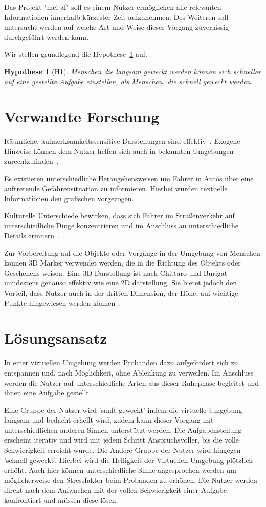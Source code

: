 \documentclass[a4paper, 11pt]{article}
\newtheorem{hyp}{Hypothese}
\newcommand{\projectName}{mci-af}
\begin{document}
Das Projekt "\projectName" soll es einem Nutzer ermöglichen alle relevanten Informationen innerhalb kürzester Zeit aufzunehmen. Des Weiteren soll untersucht werden auf welche Art und Weise dieser Vorgang zuverlässig durchgeführt werden kann.

Wir stellen grundlegend die Hypothese~\ref{hyp:aufwachen} auf:
\begin{hyp}[H\ref{hyp:aufwachen}]\label{hyp:aufwachen}
	Menschen die langsam geweckt werden können sich schneller auf eine gestellte Aufgabe einstellen, als Menschen, die schnell geweckt werden.
\end{hyp}

\section*{Verwandte Forschung}
Räumliche, aufmerksamkeitssensitive Darstellungen sind effektiv~\cite{bonanni2005attention}. Exogene Hinweise können dem Nutzer helfen sich auch in bekannten Umgebungen zurechtzufinden~\cite{bonanni2005attention}.

Es existieren unterschiedliche Herangehensweisen um Fahrer in Autos über eine auftretende Gefahrensituation zu informieren. Hierbei wurden textuelle Informationen den grafischen vorgezogen.~\cite{green1995hazard}

Kulturelle Unterschiede bewirken, dass sich Fahrer im Straßenverkehr auf unterschiedliche Dinge konzentrieren und im Anschluss an unterschiedliche Details erinnern~\cite{yumiko2017VisAttention}.

Zur Vorbereitung auf die Objekte oder Vorgänge in der Umgebung von Menschen können 3D Marker verwendet werden, die in die Richtung des Objekts oder Geschehens weisen. Eine 3D Darstellung ist nach Chittaro und Burigat mindestens genauso effektiv wie eine 2D darstellung. Sie bietet jedoch den Vorteil, dass Nutzer auch in der dritten Dimension, der Höhe, auf wichtige Punkte hingewiesen werden können~\cite{chittaro20043d}.

\section*{Lösungsansatz}
In einer virtuellen Umgebung werden Probanden dazu aufgefordert sich zu entspannen und, nach Möglichkeit, ohne Ablenkung zu verweilen. Im Anschluss werden die Nutzer auf unterschiedliche Arten aus dieser Ruhephase begleitet und ihnen eine Aufgabe gestellt. 

Eine Gruppe der Nutzer wird 'sanft geweckt' indem die virtuelle Umgebung langsam und bedacht erhellt wird, zudem kann dieser Vorgang mit unterschiedlichen anderen Sinnen unterstützt werden. Die Aufgabenstellung erscheint iterativ und wird mit jedem Schritt Anspruchsvoller, bis die volle Schwierigkeit erreicht wurde. 
Die Andere Gruppe der Nutzer wird hingegen 'schnell geweckt'. Hierbei wird die Helligkeit der Virtuellen Umgebung plötzlich erhöht. Auch hier können unterschiedliche Sinne angesprochen werden um möglicherweise den Stressfaktor beim Probanden zu erhöhen. Die Nutzer werden direkt nach dem Aufwachen mit der vollen Schwierigkeit einer Aufgabe konfrontiert und müssen diese lösen.
\end{document}
